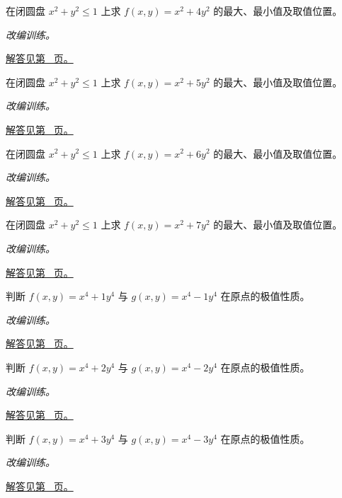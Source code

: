 \documentclass[UTF8,12pt,a4paper,fontset=fandol]{ctexart}
\begin{document}
\begin{example}[圆盘上的二次型]\label{ex:c35q15}
在闭圆盘 $x^2+y^2\le1$ 上求 $f(x,y)=x^2+4y^2$ 的最大、最小值及取值位置。
\par\textit{改编训练。}\par\hyperref[ans:c35q15]{解答见第~\pageref{ans:c35q15} 页。}
\end{example}
\begin{example}[圆盘上的二次型]\label{ex:c35q16}
在闭圆盘 $x^2+y^2\le1$ 上求 $f(x,y)=x^2+5y^2$ 的最大、最小值及取值位置。
\par\textit{改编训练。}\par\hyperref[ans:c35q16]{解答见第~\pageref{ans:c35q16} 页。}
\end{example}
\begin{example}[圆盘上的二次型]\label{ex:c35q17}
在闭圆盘 $x^2+y^2\le1$ 上求 $f(x,y)=x^2+6y^2$ 的最大、最小值及取值位置。
\par\textit{改编训练。}\par\hyperref[ans:c35q17]{解答见第~\pageref{ans:c35q17} 页。}
\end{example}
\begin{example}[圆盘上的二次型]\label{ex:c35q18}
在闭圆盘 $x^2+y^2\le1$ 上求 $f(x,y)=x^2+7y^2$ 的最大、最小值及取值位置。
\par\textit{改编训练。}\par\hyperref[ans:c35q18]{解答见第~\pageref{ans:c35q18} 页。}
\end{example}
\begin{example}\label{ex:c35q19}
判断 $f(x,y)=x^4+1y^4$ 与 $g(x,y)=x^4-1y^4$ 在原点的极值性质。
\par\textit{改编训练。}\par\hyperref[ans:c35q19]{解答见第~\pageref{ans:c35q19} 页。}
\end{example}
\begin{example}\label{ex:c35q20}
判断 $f(x,y)=x^4+2y^4$ 与 $g(x,y)=x^4-2y^4$ 在原点的极值性质。
\par\textit{改编训练。}\par\hyperref[ans:c35q20]{解答见第~\pageref{ans:c35q20} 页。}
\end{example}
\begin{example}\label{ex:c35q21}
判断 $f(x,y)=x^4+3y^4$ 与 $g(x,y)=x^4-3y^4$ 在原点的极值性质。
\par\textit{改编训练。}\par\hyperref[ans:c35q21]{解答见第~\pageref{ans:c35q21} 页。}
\end{example}
\end{document}
